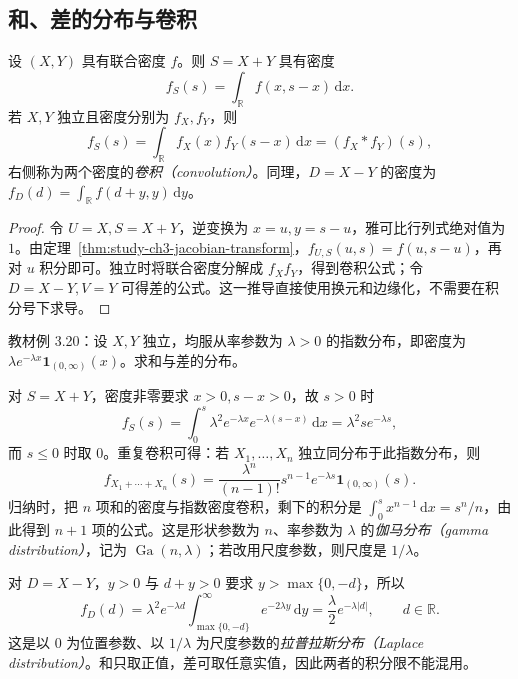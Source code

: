 \subsection{和、差的分布与卷积}

\begin{proposition}
\label{prop:study-ch3-convolution}
设 $(X,Y)$ 具有联合密度 $f$。则 $S=X+Y$ 具有密度
\begin{equation}
  f_S(s)=\int_{\mathbb R}f(x,s-x)\,\mathrm dx.
  \label{eq:study-ch3-sum-density-general}
\end{equation}
若 $X,Y$ 独立且密度分别为 $f_X,f_Y$，则
\begin{equation}
  f_S(s)=\int_{\mathbb R}f_X(x)f_Y(s-x)\,\mathrm dx
        =(f_X*f_Y)(s),
  \label{eq:study-ch3-convolution}
\end{equation}
右侧称为两个密度的\emph{卷积（convolution）}。同理，$D=X-Y$ 的密度为 $f_D(d)=\int_{\mathbb R}f(d+y,y)\,\mathrm dy$。
\end{proposition}

\begin{proof}
令 $U=X,S=X+Y$，逆变换为 $x=u,y=s-u$，雅可比行列式绝对值为 $1$。由定理~\ref{thm:study-ch3-jacobian-transform}，$f_{U,S}(u,s)=f(u,s-u)$，再对 $u$ 积分即可。独立时将联合密度分解成 $f_Xf_Y$，得到卷积公式；令 $D=X-Y,V=Y$ 可得差的公式。这一推导直接使用换元和边缘化，不需要在积分号下求导。
\end{proof}

\begin{example}
\label{ex:study-ch3-exponential-sum-difference}
教材例 3.20：设 $X,Y$ 独立，均服从率参数为 $\lambda>0$ 的指数分布，即密度为 $\lambda e^{-\lambda x}\boldsymbol 1_{(0,\infty)}(x)$。求和与差的分布。
\end{example}

\begin{solve}
对 $S=X+Y$，密度非零要求 $x>0,s-x>0$，故 $s>0$ 时
\[
  f_S(s)=\int_0^s\lambda^2e^{-\lambda x}e^{-\lambda(s-x)}\,\mathrm dx
        =\lambda^2s e^{-\lambda s},
\]
而 $s\le0$ 时取 $0$。重复卷积可得：若 $X_1,\ldots,X_n$ 独立同分布于此指数分布，则
\begin{equation}
  f_{X_1+\cdots+X_n}(s)
  =\frac{\lambda^n}{(n-1)!}s^{n-1}e^{-\lambda s}
    \boldsymbol 1_{(0,\infty)}(s).
  \label{eq:study-ch3-integer-gamma-density}
\end{equation}
归纳时，把 $n$ 项和的密度与指数密度卷积，剩下的积分是 $\int_0^s x^{n-1}\,\mathrm dx=s^n/n$，由此得到 $n+1$ 项的公式。这是形状参数为 $n$、率参数为 $\lambda$ 的\emph{伽马分布（gamma distribution）}，记为 $\operatorname{Ga}(n,\lambda)$；若改用尺度参数，则尺度是 $1/\lambda$。

对 $D=X-Y$，$y>0$ 与 $d+y>0$ 要求 $y>\max\{0,-d\}$，所以
\[
  f_D(d)=\lambda^2e^{-\lambda d}
    \int_{\max\{0,-d\}}^\infty e^{-2\lambda y}\,\mathrm dy
  =\frac\lambda2e^{-\lambda|d|},\qquad d\in\mathbb R.
\]
这是以 $0$ 为位置参数、以 $1/\lambda$ 为尺度参数的\emph{拉普拉斯分布（Laplace distribution）}。和只取正值，差可取任意实值，因此两者的积分限不能混用。
\end{solve}

